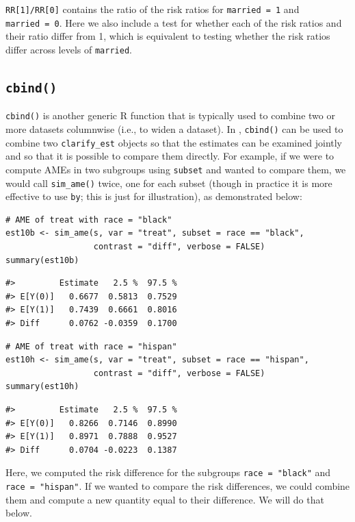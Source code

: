 \texttt{RR{[}1{]}/RR{[}0{]}} contains the ratio of the risk ratios for \texttt{married\ =\ 1} and \texttt{married\ =\ 0}. Here we also include a test for whether each of the risk ratios and their ratio differ from 1, which is equivalent to testing whether the risk ratios differ across levels of \texttt{married}.

\hypertarget{cbind}{%
\subsection{\texorpdfstring{\texttt{cbind()}}{cbind()}}\label{cbind}}

\texttt{cbind()} is another generic R function that is typically used to combine two or more datasets columnwise (i.e., to widen a dataset). In , \texttt{cbind()} can be used to combine two \texttt{clarify\_est} objects so that the estimates can be examined jointly and so that it is possible to compare them directly. For example, if we were to compute AMEs in two subgroups using \texttt{subset} and wanted to compare them, we would call \texttt{sim\_ame()} twice, one for each subset (though in practice it is more effective to use \texttt{by}; this is just for illustration), as demonstrated below:

\begin{verbatim}
# AME of treat with race = "black"
est10b <- sim_ame(s, var = "treat", subset = race == "black",
                  contrast = "diff", verbose = FALSE)
summary(est10b)
\end{verbatim}

\begin{verbatim}
#>         Estimate   2.5 %  97.5 %
#> E[Y(0)]   0.6677  0.5813  0.7529
#> E[Y(1)]   0.7439  0.6661  0.8016
#> Diff      0.0762 -0.0359  0.1700
\end{verbatim}

\begin{verbatim}
# AME of treat with race = "hispan"
est10h <- sim_ame(s, var = "treat", subset = race == "hispan",
                  contrast = "diff", verbose = FALSE)
summary(est10h)
\end{verbatim}

\begin{verbatim}
#>         Estimate   2.5 %  97.5 %
#> E[Y(0)]   0.8266  0.7146  0.8990
#> E[Y(1)]   0.8971  0.7888  0.9527
#> Diff      0.0704 -0.0223  0.1387
\end{verbatim}

Here, we computed the risk difference for the subgroups \texttt{race\ =\ "black"} and \texttt{race\ =\ "hispan"}. If we wanted to compare the risk differences, we could combine them and compute a new quantity equal to their difference. We will do that below.

